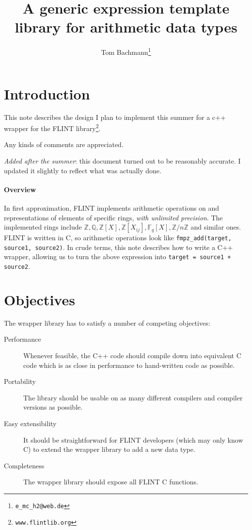 \documentclass{scrartcl}
\title{A generic expression template library for arithmetic data types}
\author{Tom Bachmann\footnote{\texttt{e\_mc\_h2@web.de}}}
\begin{document}
\maketitle

\section*{Introduction}

  This note describes the design I plan to implement this summer for a c++
wrapper for the FLINT library\footnote{\texttt{www.flintlib.org}}.

Any kinds of comments are appreciated.

\emph{Added after the summer}: this document turned out to be reasonably
accurate. I updated it slightly to reflect what was actually done.

\paragraph{Overview}
In first approximation, FLINT implements arithmetic operations on and
representations of elements of specific rings, \emph{with unlimited
precision}. The implemented rings include $\mathbb{Z}, \mathbb{Q},
\mathbb{Z}[X], \mathbb{Z}[X_{ij}], \mathbb{F}_q[X], \mathbb{Z}/n\mathbb{Z}$
and similar ones. FLINT is written in C, so arithmetic operations look like
\texttt{fmpz\_add(target, source1, source2)}. In crude terms, this note
describes how to write a C++ wrapper, allowing us to turn the above
expression into \texttt{target = source1 + source2}.


\section*{Objectives}

The wrapper library has to satisfy a number of competing objectives:

\begin{description}
\item[Performance] Whenever feasible, the C++ code should compile down into
    equivalent C code which is as close in performance to hand-written code as
    possible.
\item[Portability] The library should be usable on as many different
    compilers and compiler versions as possible.
\item[Easy extensibility] It should be straightforward for FLINT developers
    (which may only know C) to extend the wrapper library to add a new data
    type.
\item[Completeness] The wrapper library should expose all FLINT C
    functions.
\end{description}
\end{document}
